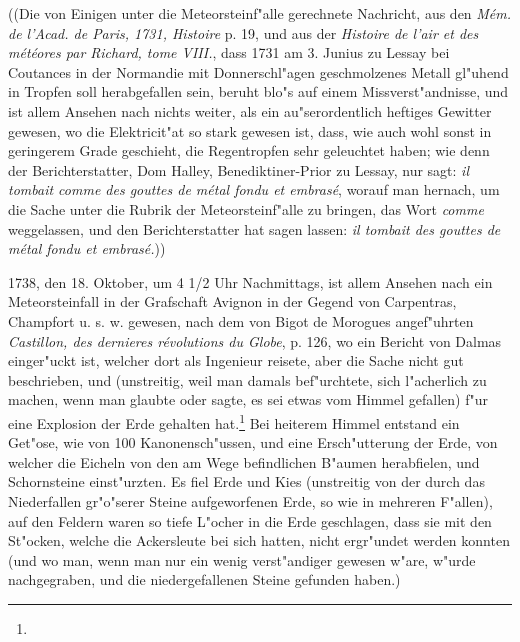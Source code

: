 \documentclass[a4paper, 11pt, oneside, polutonikogreek, german]{article}
\begin{document}
((Die von Einigen unter die Meteorsteinf"alle gerechnete Nachricht, aus den \emph{Mém. de l'Acad. de Paris, 1731, Histoire} p. 19, und aus der \emph{Histoire de l'air et des météores par Richard, tome VIII.}, dass 1731 am 3. Junius zu Lessay bei Coutances in der Normandie mit Donnerschl"agen geschmolzenes Metall gl"uhend in Tropfen soll herabgefallen sein, beruht blo"s auf einem Missverst"andnisse, und ist allem Ansehen nach nichts weiter, als ein au"serordentlich heftiges Gewitter gewesen, wo die Elektricit"at so stark gewesen ist, dass, wie auch wohl sonst in geringerem Grade geschieht, die Regentropfen sehr geleuchtet haben; wie denn der Berichterstatter, Dom Halley, Benediktiner-Prior zu Lessay, nur sagt: \emph{il tombait comme des gouttes de métal fondu et embrasé}, worauf man hernach, um die Sache unter die Rubrik der Meteorsteinf"alle zu bringen, das Wort \emph{comme} weggelassen, und den Berichterstatter hat sagen lassen: \emph{il tombait des gouttes de métal fondu et embrasé.}))

1738, den 18. Oktober, um 4 1/2 Uhr Nachmittags, ist allem Ansehen nach ein Meteorsteinfall in der Grafschaft Avignon in der Gegend von Carpentras, Champfort u. s. w. gewesen, nach dem von Bigot de Morogues angef"uhrten \emph{Castillon, des dernieres révolutions du Globe}, p. 126, wo ein Bericht von Dalmas einger"uckt ist, welcher dort als Ingenieur reisete, aber die Sache nicht gut beschrieben, und (unstreitig, weil man damals bef"urchtete, sich l"acherlich zu machen, wenn man glaubte oder sagte, es sei etwas vom Himmel gefallen) f"ur eine Explosion der Erde gehalten hat.\footnote{} Bei heiterem Himmel entstand ein Get"ose, wie von 100 Kanonensch"ussen, und eine Ersch"utterung der Erde, von welcher die Eicheln von den am Wege befindlichen B"aumen herabfielen, und Schornsteine einst"urzten. Es fiel Erde und Kies (unstreitig von der durch das Niederfallen gr"o"serer Steine aufgeworfenen Erde, so wie in mehreren F"allen), auf den Feldern waren so tiefe L"ocher in die Erde geschlagen, dass sie mit den St"ocken, welche die Ackersleute bei sich hatten, nicht ergr"undet werden konnten (und wo man, wenn man nur ein wenig verst"andiger gewesen w"are, w"urde nachgegraben, und die niedergefallenen Steine gefunden haben.)
\end{document}
